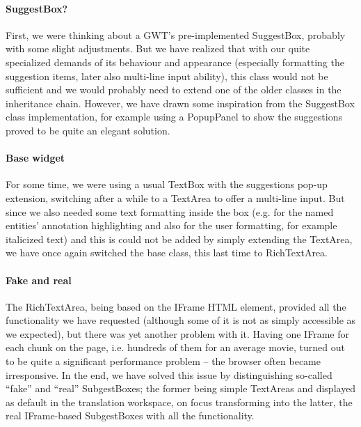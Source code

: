 \paragraph{SuggestBox?}
First, we were thinking about a GWT's pre-implemented SuggestBox, probably with some slight adjustments. But we have realized that with our quite specialized demands of its behaviour and appearance (especially formatting the suggestion items, later also multi-line input ability), this class would not be sufficient and we would probably need to extend one of the older classes in the inheritance chain. However, we have drawn some inspiration from the SuggestBox class implementation, for example using a PopupPanel to show the suggestions proved to be quite an elegant solution.

\paragraph{Base widget}
For some time, we were using a usual TextBox with the suggestions pop-up extension, switching after a while to a TextArea to offer a multi-line input. But since we also needed some text formatting inside the box (e.g. for the named entities' annotation highlighting and also for the user formatting, for example italicized text) and this is could not be added by simply extending the TextArea, we have once again switched the base class, this last time to RichTextArea.

\paragraph{Fake and real}
The RichTextArea, being based on the IFrame HTML element, provided all the functionality we have requested (although some of it is not as simply accessible as we expected), but there was yet another problem with it. Having one IFrame for each chunk on the page, i.e. hundreds of them for an average movie, turned out to be quite a significant performance problem -- the browser often became irresponsive. In the end, we have solved this issue by distinguishing so-called ``fake'' and ``real'' SubgestBoxes; the former being simple TextAreas and displayed as default in the translation workspace, on focus transforming into the latter, the real IFrame-based SubgestBoxes with all the functionality.

